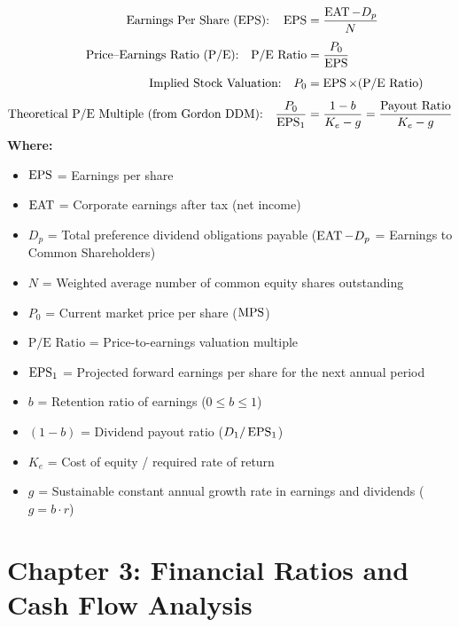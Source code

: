 \newpage
\begin{formulabox}
\begin{align*}
    \text{Earnings Per Share (EPS):} \quad \operatorname{EPS} &= \frac{\operatorname{EAT} - D_p}{N} \\[4pt]
    \text{Price--Earnings Ratio (P/E):} \quad \text{P/E Ratio} &= \frac{P_0}{\operatorname{EPS}} \\[4pt]
    \text{Implied Stock Valuation:} \quad P_0 &= \operatorname{EPS} \times (\text{P/E Ratio}) \\[4pt]
    \text{Theoretical P/E Multiple (from Gordon DDM):} \quad \frac{P_0}{\operatorname{EPS}_1} &= \frac{1 - b}{K_e - g} = \frac{\text{Payout Ratio}}{K_e - g}
\end{align*}
\textbf{Where:}
\begin{itemize}[noitemsep, topsep=2pt]
    \item $\operatorname{EPS}$ = Earnings per share
    \item $\operatorname{EAT}$ = Corporate earnings after tax (net income)
    \item $D_p$ = Total preference dividend obligations payable ($\operatorname{EAT} - D_p$ = Earnings to Common Shareholders)
    \item $N$ = Weighted average number of common equity shares outstanding
    \item $P_0$ = Current market price per share ($\operatorname{MPS}$)
    \item $\text{P/E Ratio}$ = Price-to-earnings valuation multiple
    \item $\operatorname{EPS}_1$ = Projected forward earnings per share for the next annual period
    \item $b$ = Retention ratio of earnings ($0 \le b \le 1$)
    \item $(1 - b)$ = Dividend payout ratio ($D_1 / \operatorname{EPS}_1$)
    \item $K_e$ = Cost of equity / required rate of return
    \item $g$ = Sustainable constant annual growth rate in earnings and dividends ($g = b \cdot r$)
\end{itemize}
\end{formulabox}

\newpage
\section*{Chapter 3: Financial Ratios and Cash Flow Analysis}

